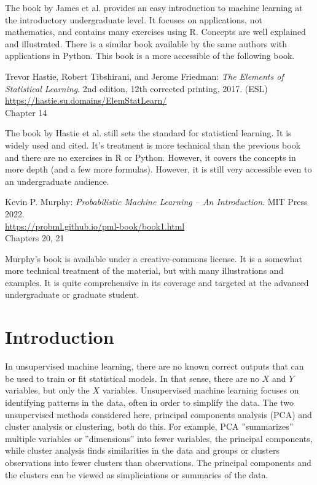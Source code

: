 The book by James et al. provides an easy introduction to machine learning at the introductory undergraduate level. It focuses on applications, not mathematics, and contains many exercises using R. Concepts are well explained and illustrated. There is a similar book available by the same authors with applications in Python. This book is a more accessible of the following book.

\begin{resourcebox}
Trevor Hastie, Robert Tibshirani, and Jerome Friedman: \emph{The Elements of Statistical Learning}. 2nd edition, 12th corrected printing, 2017. (ESL) \\

\small\url{https://hastie.su.domains/ElemStatLearn/}\normalsize \\

Chapter 14
\end{resourcebox}

The book by Hastie et al. still sets the standard for statistical learning. It is widely used and cited. It's treatment is more technical than the previous book and there are no exercises in R or Python. However, it covers the concepts in more depth (and a few more formulas). However, it is still very accessible even to an undergraduate audience.

\begin{resourcebox}
Kevin P. Murphy: \emph{Probabilistic Machine Learning -- An Introduction}. MIT Press 2022. \\


\small\url{https://probml.github.io/pml-book/book1.html}\normalsize \\

Chapters 20, 21
\end{resourcebox}

Murphy's book is available under a creative-commons license. It is a somewhat more technical treatment of the material, but with many illustrations and examples. It is quite comprehensive in its coverage and targeted at the advanced undergraduate or graduate student. 

\section{Introduction}

In unsupervised machine learning, there are no known correct outputs that can be used to train or fit statistical models. In that sense, there are no $X$ and $Y$ variables, but only the $X$ variables. Unsupervised machine learning focuses on identifying patterns in the data, often in order to simplify the data. The two unsupervised methods considered here, principal components analysis (PCA) and cluster analysis or clustering, both do this. For example, PCA ''summarizes'' multiple variables or ''dimensions'' into fewer variables, the principal components, while cluster analysis finds similarities in the data and groups or clusters observations into fewer clusters than observations. The principal components and the clusters can be viewed as simpliciations or summaries of the data. 

